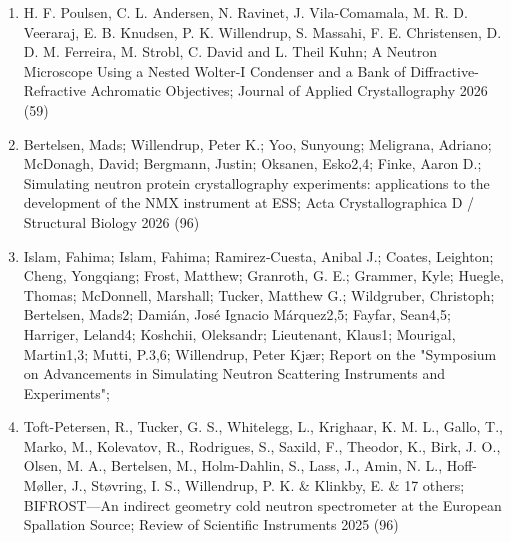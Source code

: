 \begin{enumerate}
    \item H. F. Poulsen, C. L. Andersen, N. Ravinet, J. Vila-Comamala, M. R. D. Veeraraj, E. B. Knudsen, P. K. Willendrup, S. Massahi, F. E. Christensen, D. D. M. Ferreira, M. Strobl, C. David and L. Theil Kuhn;
      A Neutron Microscope Using a Nested Wolter-I Condenser and a Bank of Diffractive-Refractive Achromatic Objectives;
      Journal of Applied Crystallography 2026 (59)
      \\
    \item Bertelsen, Mads; Willendrup, Peter K.; Yoo, Sunyoung; Meligrana, Adriano; McDonagh, David; Bergmann, Justin; Oksanen, Esko2,4; Finke, Aaron D.;
      Simulating neutron protein crystallography experiments: applications to the development of the NMX instrument at ESS;
      Acta Crystallographica D / Structural Biology 2026 (96)
      \\
      \item Islam, Fahima; Islam, Fahima; Ramirez‐Cuesta, Anibal J.;
        Coates, Leighton; Cheng, Yongqiang; Frost, Matthew; Granroth,
        G. E.; Grammer, Kyle; Huegle, Thomas; McDonnell, Marshall;
        Tucker, Matthew G.; Wildgruber, Christoph; Bertelsen, Mads2;
        Damián, José Ignacio Márquez2,5; Fayfar, Sean4,5; Harriger,
        Leland4; Koshchii, Oleksandr; Lieutenant, Klaus1; Mourigal,
        Martin1,3; Mutti, P.3,6; Willendrup, Peter Kj\ae r; Report on
        the "Symposium on Advancements in Simulating Neutron
        Scattering Instruments and Experiments";
       \\
      \item Toft-Petersen, R., Tucker, G. S., Whitelegg, L., Krighaar,
      K. M. L., Gallo, T., Marko, M., Kolevatov, R., Rodrigues, S.,
      Saxild, F., Theodor, K., Birk, J. O., Olsen, M. A., Bertelsen,
      M., Holm-Dahlin, S., Lass, J., Amin, N. L., Hoff-Møller, J.,
      Støvring, I. S., Willendrup, P. K. \& Klinkby, E. \& 17 others;
      BIFROST—An indirect geometry cold neutron spectrometer at the
      European Spallation Source;
      Review of Scientific Instruments 2025 (96)
      \\

\end{enumerate}
